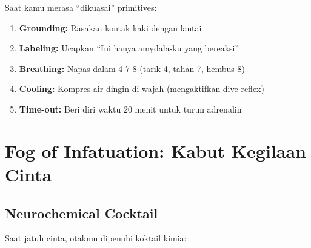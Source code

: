 \begin{tipbox}
Saat kamu merasa ``dikuasai'' primitives:
\begin{enumerate}
    \item \textbf{Grounding:} Rasakan kontak kaki dengan lantai
    \item \textbf{Labeling:} Ucapkan ``Ini hanya amydala-ku yang bereaksi''
    \item \textbf{Breathing:} Napas dalam 4-7-8 (tarik 4, tahan 7, hembus 8)
    \item \textbf{Cooling:} Kompres air dingin di wajah (mengaktifkan dive reflex)
    \item \textbf{Time-out:} Beri diri waktu 20 menit untuk turun adrenalin
\end{enumerate}
\end{tipbox}

\section{Fog of Infatuation: Kabut Kegilaan Cinta}

\subsection{Neurochemical Cocktail}

Saat jatuh cinta, otakmu dipenuhi koktail kimia:

